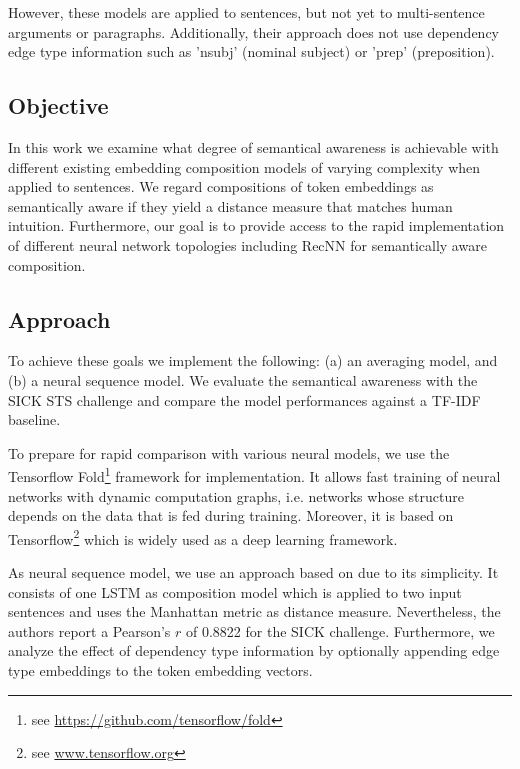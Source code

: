 However, these models are applied to sentences, but not yet to multi-sentence arguments or paragraphs. Additionally, their  approach does not use dependency edge type information such as 'nsubj' (nominal subject) or 'prep' (preposition).

\subsection{Objective}
In this work we examine what degree of semantical awareness is achievable with different existing embedding composition models of varying complexity when applied to sentences. We regard compositions of token embeddings as semantically aware if they yield a distance measure that matches human intuition. Furthermore, our goal is to provide access to the rapid implementation of different neural network topologies including \ac{RecNN} for semantically aware composition.

\subsection{Approach}
To achieve these goals we implement the following: (a) an averaging model, and (b) a neural sequence model. We evaluate the semantical awareness with the SICK \ac{STS} challenge \autocite{marelli_sick_2014} and compare the model performances against a \acs{TF-IDF} baseline.

To prepare for rapid comparison with various neural models, we use the Tensorflow Fold\footnote{see \url{https://github.com/tensorflow/fold}} framework \autocite{looks_deep_2017} for implementation. It allows fast training of neural networks with dynamic computation graphs, i.e. networks whose structure depends on the data that is fed during training. Moreover, it is based on Tensorflow\footnote{see \url{www.tensorflow.org}} which is widely used as a deep learning framework.


As neural sequence model, we use an approach based on \Textcite{mueller_siamese_2016} due to its simplicity. It consists of one LSTM as composition model which is applied to two input sentences and uses the Manhattan metric as distance measure. Nevertheless, the authors report a Pearson's $r$ of 0.8822 for the SICK challenge. Furthermore, we analyze the effect of dependency type information by optionally appending edge type embeddings to the token embedding vectors. 

